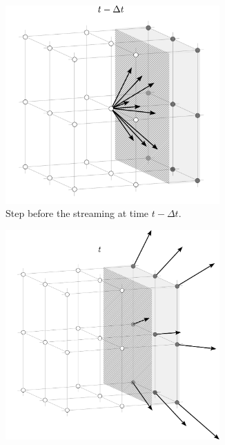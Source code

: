\begin{figure}[h]
	\centering
	\label{fig:fbb}
	\begin{subfigure}{0.48\textwidth}
		\centering
		\includegraphics[width=0.9\textwidth, trim={0mm 0mm 0mm 0mm}]{figures/fwbba.pdf}
		\caption{Step before the streaming at time $t - \Delta t$.}
		\label{fig:bba}
	\end{subfigure}
	\begin{subfigure}{0.48\textwidth}
		\centering
		\includegraphics[width=0.9\textwidth, trim={0mm 0mm 0mm 0mm}]{figures/fwbbb.pdf}

\end{subfigure}
\end{figure}

